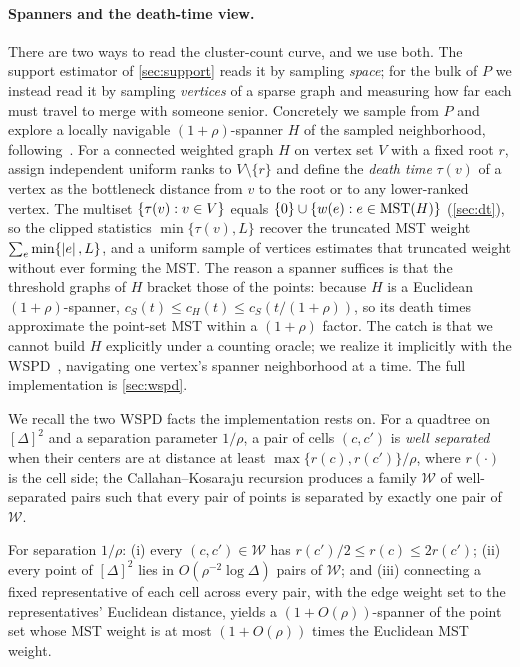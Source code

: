 \paragraph{Spanners and the death-time view.}
There are two ways to read the cluster-count curve, and we use both. The support estimator of
\cref{sec:support} reads it by sampling \emph{space}; for the bulk of $P$ we instead read it by sampling
\emph{vertices} of a sparse graph and measuring how far each must travel to merge with someone senior.
Concretely we sample from $P$ and explore a locally navigable $(1+\rho)$-spanner $H$ of the sampled
neighborhood, following~\cite{DMOSW25}. For a connected weighted graph $H$ on vertex set $V$ with a fixed
root $r$, assign independent uniform ranks to $V\setminus\{r\}$ and define the \emph{death time} $\tau(v)$
of a vertex as the bottleneck distance from $v$ to the root or to any lower-ranked vertex. The multiset
$\left\{\tau(v):v\in V\right\}$ equals $\left\{0\right\}\cup\left\{w(e):e\in\mathrm{MST}(H)\right\}$ (\cref{sec:dt}), so the clipped
statistics $\min\{\tau(v),L\}$ recover the truncated MST weight $\sum_{e}\min\{\left|e\right|,L\}$, and a uniform
sample of vertices estimates that truncated weight without ever forming the MST. The reason a spanner
suffices is that the threshold graphs of $H$ bracket those of the points: because $H$ is a Euclidean
$(1+\rho)$-spanner, $c_S(t)\le c_H(t)\le c_S(t/(1+\rho))$, so its death times approximate the point-set
MST within a $(1+\rho)$ factor. The catch is that we cannot build $H$ explicitly under a counting oracle;
we realize it implicitly with the WSPD~\cite{CK95,HarPeled11},
navigating one vertex's spanner neighborhood at a time. The full implementation is \cref{sec:wspd}.

We recall the two WSPD facts the implementation rests on. For a quadtree on $[\Delta]^2$ and a separation
parameter $1/\rho$, a pair of cells $(c,c')$ is \emph{well separated} when their centers are at distance at
least $\max\{r(c),r(c')\}/\rho$, where $r(\cdot)$ is the cell side; the Callahan--Kosaraju recursion
produces a family $\mathcal W$ of well-separated pairs such that every pair of points is separated by
exactly one pair of $\mathcal W$.

\begin{lemma}\label{lem:wspd-prelim}
For separation $1/\rho$: (i) every $(c,c')\in\mathcal W$ has $r(c')/2\le r(c)\le 2r(c')$; (ii) every point
of $[\Delta]^2$ lies in $O(\rho^{-2}\log\Delta)$ pairs of $\mathcal W$; and (iii) connecting a fixed
representative of each cell across every pair, with the edge weight set to the representatives' Euclidean
distance, yields a $(1+O(\rho))$-spanner of the point set whose MST weight is at most $(1+O(\rho))$ times
the Euclidean MST weight.
\end{lemma}

